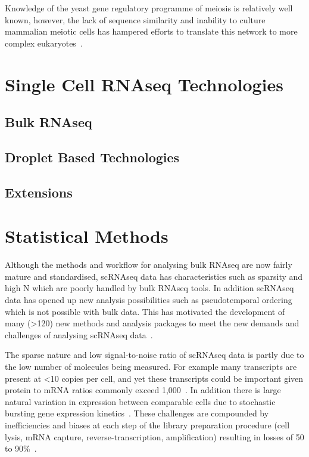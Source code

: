 
Knowledge of the yeast gene regulatory programme of meiosis is relatively well known, however, the lack of sequence similarity and inability to culture mammalian meiotic cells has hampered efforts to translate this network to more complex eukaryotes~\cite{Brar2011HighResolution,Mata2002Transcriptional,Chu1998Transcriptional,Handel2010Genetics}.


\section{Single Cell RNAseq Technologies}

\subsection{Bulk RNAseq}


\subsection{Droplet Based Technologies}

\subsection{Extensions}

\section{Statistical Methods}

Although the methods and workflow for analysing bulk RNAseq are now fairly mature and standardised, scRNAseq data has characteristics such as sparsity and high N which are poorly handled by bulk RNAseq tools. In addition scRNAseq data has opened up new analysis possibilities such as pseudotemporal ordering which is not possible with bulk data. This has motivated the development of many (\textgreater 120) new methods and analysis packages to meet the new demands and challenges of analysing scRNAseq data~\cite{Zappia2017ScRNAtools}.

The sparse nature and low signal-to-noise ratio of scRNAseq data is partly due to the low number of molecules being measured. For example many transcripts are present at \textless 10 copies per cell, and yet these transcripts could be important given protein to mRNA ratios commonly exceed 1,000~\cite{Lahtvee2017Absolute,Marguerat2012Quantitative}. In addition there is large natural variation in expression between comparable cells due to stochastic bursting gene expression kinetics~\cite{Raj2006Stochastic}. These challenges are compounded by inefficiencies and biases at each step of the library preparation procedure (cell lysis, mRNA capture, reverse-transcription, amplification) resulting in losses of 50 to 90\%~\cite{Islam2012Highly}.

